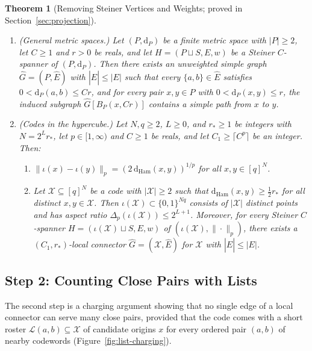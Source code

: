 \documentclass[11pt]{article}
\newtheorem{theorem}{Theorem}[section]
\theoremstyle{definition}
\theoremstyle{remark}
\newcommand{\dP}{\mathrm{d}_P}
\newcommand{\Ham}{\mathrm{Ham}}
\newcommand{\dHam}{\mathrm{d}_{\Ham}}
\begin{document}
\begin{theorem}[Removing Steiner Vertices and Weights; proved in Section~\ref{sec:projection}]
\label{thm:mod1-projection}
\leavevmode
\begin{enumerate}[label=(\alph*)]
  \item \emph{(General metric spaces.)} Let $(P, \dP)$ be a finite metric space with $|P| \ge 2$, let $C \ge 1$ and $r > 0$ be reals, and let $H = (P \sqcup S, E, w)$ be a Steiner $C$-spanner of $(P, \dP)$. Then there exists an unweighted simple graph $\widehat{G} = (P, \widehat{E})$ with $|\widehat{E}| \le |E|$ such that every $\{a, b\} \in \widehat{E}$ satisfies $0 < \dP(a, b) \le C r$, and for every pair $x, y \in P$ with $0 < \dP(x, y) \le r$, the induced subgraph $\widehat{G}[B_P(x, C r)]$ contains a simple path from $x$ to $y$.
  \item \emph{(Codes in the hypercube.)} Let $N, q \ge 2$, $L \ge 0$, and $r_* \ge 1$ be integers with $N = 2^L r_*$, let $p \in [1, \infty)$ and $C \ge 1$ be reals, and let $C_1 \ge \lceil C^p \rceil$ be an integer. Then:
  \begin{enumerate}[label=(\roman*),nosep]
    \item $\|\iota(x) - \iota(y)\|_p = (2\,\dHam(x, y))^{1/p}$ for all $x, y \in [q]^N$.
    \item Let $\mathcal{X} \subseteq [q]^N$ be a code with $|\mathcal{X}| \ge 2$ such that $\dHam(x, y) \ge \frac{1}{2} r_*$ for all distinct $x, y \in \mathcal{X}$. Then $\iota(\mathcal{X}) \subset \{0, 1\}^{N q}$ consists of $|\mathcal{X}|$ distinct points and has aspect ratio $\Delta_p(\iota(\mathcal{X})) \le 2^{L + 1}$. Moreover, for every Steiner $C$-spanner $H = (\iota(\mathcal{X}) \sqcup S, E, w)$ of $(\iota(\mathcal{X}), \|\cdot\|_p)$, there exists a $(C_1, r_*)$-local connector $\widehat{G} = (\mathcal{X}, \widehat{E})$ for $\mathcal{X}$ with $|\widehat{E}| \le |E|$.
  \end{enumerate}
\end{enumerate}
\end{theorem}

\subsection{Step 2: Counting Close Pairs with Lists}
\label{subsec:mod2}

The second step is a charging argument showing that no single edge of a local connector can serve many close pairs, provided that the code comes with a short roster $\mathcal{L}(a, b) \subseteq \mathcal{X}$ of candidate origins $x$ for every ordered pair $(a, b)$ of nearby codewords (Figure~\ref{fig:list-charging}).
\end{document}
